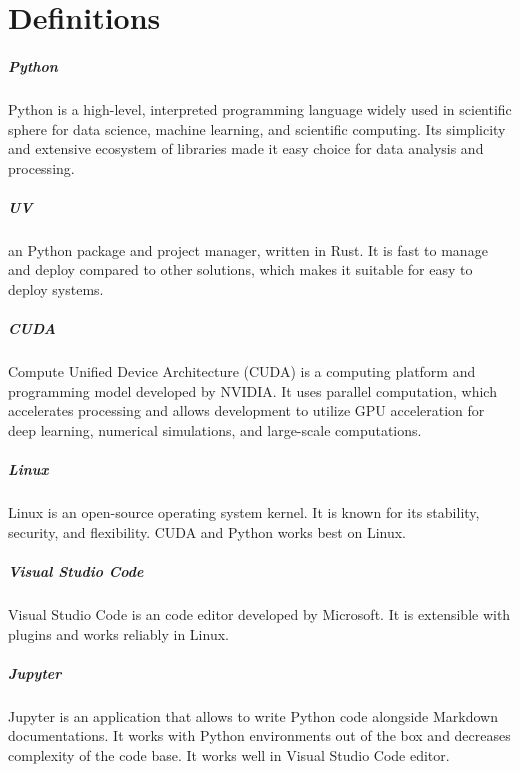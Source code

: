 \chapter{Definitions}
\label{chap:definitions}
\setlength{\parskip}{1em}

\paragraph{Python} Python is a high-level, interpreted programming language widely used in scientific sphere for data science, machine learning, and scientific computing. Its simplicity and extensive ecosystem of libraries made it easy choice for data analysis and processing.

\paragraph{UV} an Python package and project manager, written in Rust. It is fast to manage and deploy compared to other solutions, which makes it suitable for easy to deploy systems.

\paragraph{CUDA} Compute Unified Device Architecture (CUDA) is a computing platform and programming model developed by NVIDIA. It uses parallel computation, which accelerates processing and allows development to utilize GPU acceleration for deep learning, numerical simulations, and large-scale computations.

\paragraph{Linux} Linux is an open-source operating system kernel. It is known for its stability, security, and flexibility. CUDA and Python works best on Linux.

\paragraph{Visual Studio Code} Visual Studio Code is an code editor developed by Microsoft. It is extensible with plugins and works reliably in Linux. 

\paragraph{Jupyter} Jupyter is an application that allows to write Python code alongside Markdown documentations. It works with Python environments out of the box and decreases complexity of the code base. It works well in Visual Studio Code editor.

